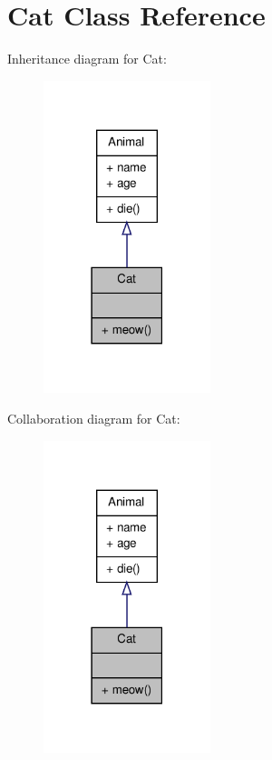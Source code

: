 \hypertarget{class_cat}{\section{Cat Class Reference}
\label{class_cat}
}


Inheritance diagram for Cat\-:
\nopagebreak
\begin{figure}[H]
\begin{center}
\leavevmode
\includegraphics[width=138pt]{class_cat__inherit__graph}
\end{center}
\end{figure}


Collaboration diagram for Cat\-:
\nopagebreak
\begin{figure}[H]
\begin{center}
\leavevmode
\includegraphics[width=138pt]{class_cat__coll__graph}
\end{center}
\end{figure}
